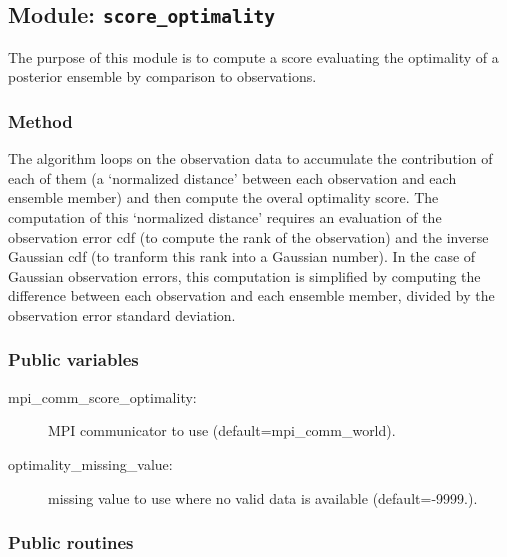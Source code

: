 \documentclass[11pt]{article}
\begin{document}
\subsection{Module: {\tt\bf score\_optimality}}

The purpose of this module is to compute a score
evaluating the optimality of a posterior ensemble
by comparison to observations.

\subsubsection*{Method}

The algorithm loops on the observation data
to accumulate the contribution of each of them
(a `normalized distance' between each observation and each ensemble member)
and then compute the overal optimality score.
The computation of this `normalized distance' requires an evaluation
of the observation error cdf (to compute the rank of the observation)
and the inverse Gaussian cdf (to tranform this rank into a Gaussian number).
In the case of Gaussian observation errors, this computation is simplified
by computing the difference between each observation and each ensemble member,
divided by the observation error standard deviation.

\subsubsection*{Public variables}

\begin{description}
\item[mpi\_comm\_score\_optimality:] MPI communicator to use (default=mpi\_comm\_world).
\item[optimality\_missing\_value:] missing value to use where no valid data is available (default=-9999.).
\end{description}

\subsubsection*{Public routines}
\end{document}
